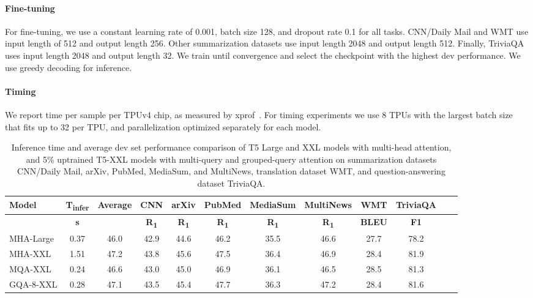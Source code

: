 \documentclass[11pt]{article}
\newcommand{\mh}{\textsc{MHA}\xspace}
\newcommand{\mq}{\textsc{MQA}\xspace}
\newcommand{\gmq}{\textsc{GQA}\xspace}
\begin{document}
\paragraph{Fine-tuning}

For fine-tuning, we use a constant learning rate of 0.001, batch size 128, and dropout rate 0.1 for all tasks. CNN/Daily Mail and WMT use input length of 512 and output length 256. Other summarization datasets use input length 2048 and output length 512. Finally, TriviaQA uses input length 2048 and output length 32. We train until convergence and select the checkpoint with the highest dev performance. We use greedy decoding for inference.

\paragraph{Timing}
We report time per sample per TPUv4 chip, as measured by xprof~\citep{xprof}. For timing experiments we use 8 TPUs with the largest batch size that fits up to 32 per TPU, and parallelization optimized separately for each model.
\begin{table}[ht!]
\centering
\footnotesize
\begin{tabular}{l|cc|ccccccccc}
\toprule
\textbf{Model} &  \textbf{T\textsubscript{infer}}& \textbf{Average} & \textbf{CNN}  &  \textbf{arXiv} & \textbf{PubMed}  &\textbf{MediaSum} & \textbf{MultiNews} &  \textbf{WMT} &  \textbf{TriviaQA}  \\
\midrule
  & \textbf{s} &  & \textbf{R\textsubscript{1}}  & \textbf{R\textsubscript{1}} &  \textbf{R\textsubscript{1}} & \textbf{R\textsubscript{1}}  &\textbf{R\textsubscript{1}} & \textbf{BLEU} & \textbf{F1}   \\
 \midrule
  \mh-Large &  0.37 & 46.0 & 42.9 & 44.6 & 46.2 & 35.5 & 46.6 & 27.7 & 78.2 \\
 \mh-XXL & 1.51 & 47.2 &  43.8 & 45.6 & 47.5 & 36.4 & 46.9 & 28.4 & 81.9 \\
 \mq-XXL  & 0.24 & 46.6 & 43.0 & 45.0 & 46.9 & 36.1 & 46.5 & 28.5 & 81.3 \\
 \gmq-8-XXL & 0.28  & 47.1 & 43.5 & 45.4 & 47.7 & 36.3 & 47.2 & 28.4 & 81.6 \\
\midrule
\bottomrule
\end{tabular}
\caption{Inference time and average dev set performance comparison of T5 Large and XXL models with multi-head attention, and 5\% uptrained T5-XXL models with multi-query and grouped-query attention on summarization datasets CNN/Daily Mail, arXiv, PubMed, MediaSum, and MultiNews, translation dataset WMT, and question-answering dataset TriviaQA.}
\label{table:headline_results}
\end{table}
\end{document}
